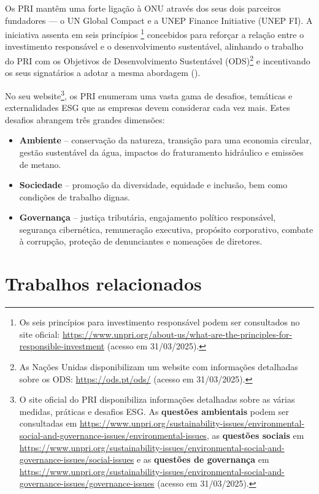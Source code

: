 Os PRI mantêm uma forte ligação à \gls{ONU} através dos seus dois parceiros fundadores — o UN Global Compact e a UNEP Finance Initiative (UNEP FI). A iniciativa assenta em seis princípios \footnote{Os seis princípios para investimento responsável podem ser consultados no site oficial: \url{https://www.unpri.org/about-us/what-are-the-principles-for-responsible-investment} (acesso em 31/03/2025).} concebidos para reforçar a relação entre o investimento responsável e o desenvolvimento sustentável, alinhando o trabalho do PRI com os Objetivos de Desenvolvimento Sustentável (ODS)\footnote{As Nações Unidas disponibilizam um website com informações detalhadas sobre os ODS: \url{https://ods.pt/ods/} (acesso em 31/03/2025).} e incentivando os seus signatários a adotar a mesma abordagem (\cite{PRIBlueprint2017}).

No seu website\footnote{O site oficial do PRI disponibiliza informações detalhadas sobre as várias medidas, práticas e desafios ESG. As \textbf{questões ambientais} podem ser consultadas em \url{https://www.unpri.org/sustainability-issues/environmental-social-and-governance-issues/environmental-issues}, as \textbf{questões sociais} em \url{https://www.unpri.org/sustainability-issues/environmental-social-and-governance-issues/social-issues} e as \textbf{questões de governança} em \url{https://www.unpri.org/sustainability-issues/environmental-social-and-governance-issues/governance-issues} (acesso em 31/03/2025).}, os \gls{PRI} enumeram uma vasta gama de desafios, temáticas e externalidades ESG que as empresas devem considerar cada vez mais. Estes desafios abrangem três grandes dimensões:

\begin{itemize}
\item \textbf{Ambiente} – conservação da natureza, transição para uma economia circular, gestão sustentável da água, impactos do fraturamento hidráulico e emissões de metano.
\item \textbf{Sociedade} – promoção da diversidade, equidade e inclusão, bem como condições de trabalho dignas.
\item \textbf{Governança} – justiça tributária, engajamento político responsável, segurança cibernética, remuneração executiva, propósito corporativo, combate à corrupção, proteção de denunciantes e nomeações de diretores.
\end{itemize}


\section{Trabalhos relacionados} 
\label{sec:TR} 

